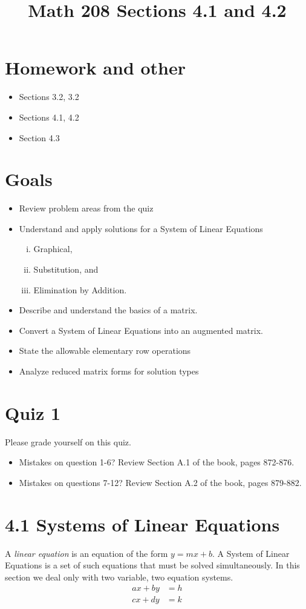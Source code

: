 \documentclass[14pt]{extarticle}
\title{\vspace{-5ex}Math 208 Sections 4.1 and 4.2}
\date{\vspace{-10ex}}
\begin{document}
\maketitle		
\section{Homework and other}
\begin{itemize}
\item Sections 3.2, 3.2
\item Sections 4.1, 4.2
\item Section 4.3
\end{itemize}

\section{Goals}
\begin{itemize}
	\item Review problem areas from the quiz
	\item Understand and apply solutions for a System of Linear Equations 
	\begin{enumerate}[(i)]
		\item Graphical,
		\item Substitution, and
		\item Elimination by Addition.
	\end{enumerate}
	\item Describe and understand the basics of a matrix.
	\item Convert a System of Linear Equations into an augmented matrix.
	\item State the allowable elementary row operations
	\item Analyze reduced matrix forms for solution types
\end{itemize}

\section{Quiz 1}
Please grade yourself on this quiz.
\begin{itemize}
	\item Mistakes on question 1-6? Review Section A.1 of the book, pages 872-876.
	\item Mistakes on questions 7-12? Review Section A.2 of the book, pages 879-882.
\end{itemize}

\section*{4.1 Systems of Linear Equations}
A \textit{linear equation} is an equation of the form $y=mx+b$. A System of Linear Equations is a set of such equations that must be solved simultaneously. In this section we deal only with two variable, two equation systems.
\begin{align*}
	ax+by &=h \\
	cx+dy &=k
\end{align*}
\end{document}
